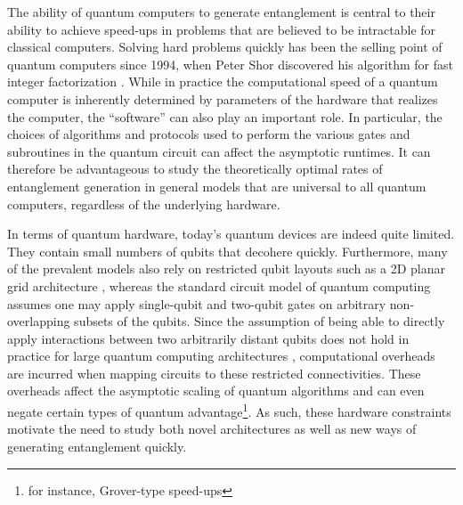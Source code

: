 The ability of quantum computers to generate entanglement is central to their ability to achieve speed-ups in problems that are believed to be intractable for classical computers.
Solving hard problems quickly has been the selling point of quantum computers since 1994, when Peter Shor discovered his algorithm for fast integer factorization \cite{Shor1997}.
While in practice the computational speed of a quantum computer is inherently determined by parameters of the hardware that realizes the computer, the ``software'' can also play an important role.
In particular, the choices of algorithms and protocols used to perform the various gates and subroutines in the quantum circuit can affect the asymptotic runtimes.
It can therefore be advantageous to study the theoretically optimal rates of entanglement generation in general models that are universal to all quantum computers, regardless of the underlying hardware.

In terms of quantum hardware, today's quantum devices are indeed quite limited. They contain small numbers of qubits that decohere quickly. Furthermore, many of the prevalent models also rely on restricted qubit layouts such as a 2D planar grid architecture \cite{Arute2019}, whereas the standard circuit model of quantum computing assumes one may apply single-qubit and two-qubit gates on arbitrary non-overlapping subsets of the qubits.
Since the assumption of being able to directly apply interactions between two arbitrarily distant qubits does not hold in practice for large quantum computing architectures \cite{Monroe2014,Linke2017,Bapat2018,Childs2019c,Bapat2022}, computational overheads are incurred when mapping circuits to these restricted connectivities.
These overheads affect the asymptotic scaling of quantum algorithms and can even negate certain types of quantum advantage\footnote{for instance, Grover-type speed-ups}.
As such, these hardware constraints motivate the need to study both novel architectures as well as new ways of  generating entanglement quickly.


